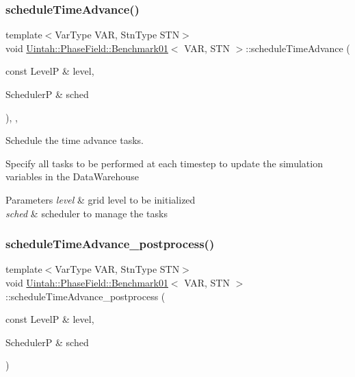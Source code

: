 \subsubsection{\texorpdfstring{schedule\+Time\+Advance()}{scheduleTimeAdvance()}}
{\footnotesize\ttfamily template$<$Var\+Type V\+AR, Stn\+Type S\+TN$>$ \\
void \hyperlink{classUintah_1_1PhaseField_1_1Benchmark01}{Uintah\+::\+Phase\+Field\+::\+Benchmark01}$<$ V\+AR, S\+TN $>$\+::schedule\+Time\+Advance (\begin{DoxyParamCaption}\item[{const LevelP \&}]{level,  }\item[{SchedulerP \&}]{sched }\end{DoxyParamCaption})\hspace{0.3cm}{\ttfamily [override]}, {\ttfamily [protected]}, {\ttfamily [virtual]}}



Schedule the time advance tasks. 

Specify all tasks to be performed at each timestep to update the simulation variables in the Data\+Warehouse


\begin{DoxyParams}{Parameters}
{\em level} & grid level to be initialized \\
\hline
{\em sched} & scheduler to manage the tasks \\
\hline
\end{DoxyParams}
\mbox{\label{classUintah_1_1PhaseField_1_1Benchmark01_ae448ca51efff33aa178ea1b8c4b54143}} 
\subsubsection{\texorpdfstring{schedule\+Time\+Advance\+\_\+postprocess()}{scheduleTimeAdvance\_postprocess()}}
{\footnotesize\ttfamily template$<$Var\+Type V\+AR, Stn\+Type S\+TN$>$ \\
void \hyperlink{classUintah_1_1PhaseField_1_1Benchmark01}{Uintah\+::\+Phase\+Field\+::\+Benchmark01}$<$ V\+AR, S\+TN $>$\+::schedule\+Time\+Advance\+\_\+postprocess (\begin{DoxyParamCaption}\item[{const LevelP \&}]{level,  }\item[{SchedulerP \&}]{sched }\end{DoxyParamCaption})\hspace{0.3cm}{\ttfamily [protected]}}



